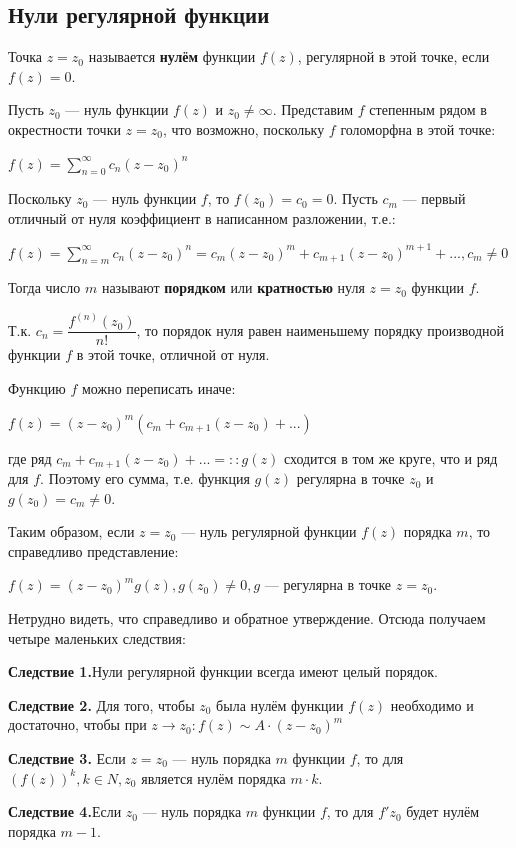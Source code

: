 \documentclass[a4paper, 12pt]{report}
\begin{document}
\subsection{Нули регулярной функции}
Точка $z = z_0$ называется \textbf{нулём} функции $f(z)$, регулярной в этой точке, если $f(z) = 0$.
\par\bigskip
Пусть $z_0$ --- нуль функции $f(z)$ и $z_0 \ne \infty$. Представим $f$ степенным рядом в окрестности точки $z = z_0$, что возможно, поскольку $f$ голоморфна в этой точке:

\begin{center}
    $f(z) = \sum\limits_{n=0}^{\infty}c_n(z - z_0)^n$
\end{center}

Поскольку $z_0$ --- нуль функции $f$, то $f(z_0) = c_0 = 0$. Пусть $c_m$ --- первый отличный от нуля коэффициент в написанном разложении, т.е.:

\begin{center}
    $f(z) = \sum\limits_{n=m}^{\infty}c_n(z - z_0)^n = c_m(z - z_0)^m + c_{m+1}(z - z_0)^{m+1} + ..., c_m \ne 0$
\end{center}

Тогда число $m$ называют \textbf{порядком} или \textbf{кратностью} нуля $z = z_0$ функции $f$.
\par\bigskip
Т.к. $c_n = \dfrac{f^{(n)}(z_0)}{n!}$, то порядок нуля равен наименьшему порядку производной функции $f$ в этой точке, отличной от нуля.
\par\bigskip
Функцию $f$ можно переписать иначе:

\begin{center}
    $f(z) = (z - z_0)^m (c_m + c_{m+1}(z - z_0) + ...)$
\end{center}

где ряд $c_m + c_{m+1}(z - z_0) + ... =:: g(z)$ сходится в том же круге, что и ряд для $f$. Поэтому его сумма, т.е. функция $g(z)$ регулярна в точке $z_0$ и $g(z_0) = c_m \ne 0$.
\par\bigskip
Таким образом, если $z = z_0$ --- нуль регулярной функции $f(z)$ порядка $m$, то справедливо представление:

\begin{center}
    $f(z) = (z - z_0)^m g(z), g(z_0) \ne 0, g$ --- регулярна в точке $z = z_0$.
\end{center}

Нетрудно видеть, что справедливо и обратное утверждение. Отсюда получаем четыре маленьких следствия:
\par\bigskip
\textbf{Следствие 1.}\quad Нули регулярной функции всегда имеют целый порядок.
\par\bigskip
\textbf{Следствие 2.} \quad Для того, чтобы $z_0$ была нулём функции $f(z)$ необходимо и достаточно, чтобы при $z \rightarrow z_0: f(z) \sim A \cdot (z - z_0)^m$
\par\bigskip
\textbf{Следствие 3.} Если $z = z_0$ --- нуль порядка $m$ функции $f$, то для $(f(z))^k, k \in N, z_0$ является нулём порядка $m \cdot k$.
\par\bigskip
\textbf{Следствие 4.}\quad Если $z_0$ --- нуль порядка $m$ функции $f$, то для $f' z_0$ будет нулём порядка $m - 1$.
\par\bigskip
\end{document}
